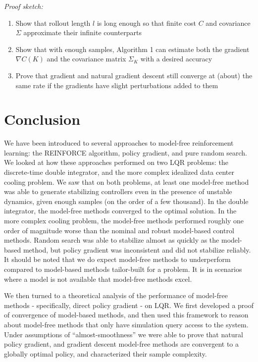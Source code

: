 \documentclass{article}[12pt]
\begin{document}
\textit{Proof sketch:}
\begin{enumerate}
\item Show that rollout length $l$ is long enough so that finite cost $C$ and covariance $\Sigma$ approximate their infinite counterparts
\item Show that with enough samples, Algorithm 1 can estimate both the gradient $\nabla C(K)$ and the covariance matrix $\Sigma_K$ with a desired accuracy
\item Prove that gradient and natural gradient descent still converge at (about) the same rate if the gradients have slight perturbations added to them
\end{enumerate}

\section{Conclusion}

We have been introduced to several approaches to model-free reinforcement learning: the REINFORCE algorithm, policy gradient, and pure random search. We looked at how these approaches performed on two LQR problems: the discrete-time double integrator, and the more complex idealized data center cooling problem. We saw that on both problems, at least one model-free method was able to generate stabilizing controllers even in the presence of unstable dynamics, given enough samples (on the order of a few thousand). In the double integrator, the model-free methods converged to the optimal solution. In the more complex cooling problem, the model-free methods performed roughly one order of magnitude worse than the nominal and robust model-based control methods. Random search was able to stabilize almost as quickly as the model-based method, but policy gradient was inconsistent and did not stabilize reliably. It should be noted that we do expect model-free methods to underperform compared to model-based methods tailor-built for a problem. It is in scenarios where a model is not available that model-free methods excel. 

We then turned to a theoretical analysis of the performance of model-free methods - specifically, direct policy gradient - on LQR. We first developed a proof of convergence of model-based methods, and then used this framework to reason about model-free methods that only have simulation query access to the system. Under assumptions of ``almost-smoothness'' we were able to prove that natural policy gradient, and gradient descent model-free methods are convergent to a globally optimal policy, and characterized their sample complexity.







%
 
\end{document}
